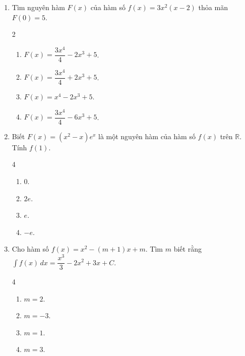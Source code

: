 \documentclass[12pt]{article}
\begin{document}
\begin{enumerate}[label=\textbf{Câu \arabic*.}]
\begin{multicols}{4}
\begin{enumerate}[label=\textbf{\Alph*.}]
				\item $\cot x + \tan x + C$.
				\item $\cot x - \tan x + C$.
				\item $-\cot x + \tan x + C$.
				\item $-\cot x - \tan x + C$.
			\end{enumerate}
		\end{multicols}
		
		\item Tìm nguyên hàm $F(x)$ của hàm số $f(x) = 3x^2(x - 2)$ thỏa mãn $F(0) = 5$.
		\begin{multicols}{2}
			\begin{enumerate}[label=\textbf{\Alph*.}]
				\item $F(x) = \dfrac{3x^4}{4} - 2x^3 + 5$.
				\item $F(x) = \dfrac{3x^4}{4} + 2x^3 + 5$.
				\item $F(x) = x^4 - 2x^3 + 5$.
				\item $F(x) = \dfrac{3x^4}{4} - 6x^3 + 5$.
			\end{enumerate}
		\end{multicols}
		
		\item Biết $F(x) = (x^2 - x)e^x$ là một nguyên hàm của hàm số $f(x)$ trên $\mathbb{R}$. Tính $f(1)$.
		\begin{multicols}{4}
			\begin{enumerate}[label=\textbf{\Alph*.}]
				
				\item $0$.
				\item $2e$.
				\item $e$.
				\item $-e$.
			\end{enumerate}
		\end{multicols}
		
		\item Cho hàm số $f(x) = x^2 - (m+1)x + m$. Tìm $m$ biết rằng $\displaystyle \int f(x) \,dx = \dfrac{x^3}{3} - 2x^2 + 3x + C$.
		\begin{multicols}{4}
			\begin{enumerate}[label=\textbf{\Alph*.}]
				
				\item $m = 2$.
				\item $m = -3$.
				\item $m = 1$.
				\item $m = 3$.
			\end{enumerate}
		\end{multicols}
		

\end{enumerate}
\end{document}
